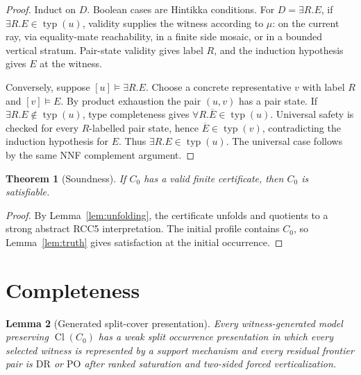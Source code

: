 \documentclass[11pt]{article}
\newtheorem{theorem}{Theorem}[section]
\newtheorem{lemma}[theorem]{Lemma}
\newcommand{\Cl}{\operatorname{Cl}}
\newcommand{\typ}{\operatorname{typ}}
\newcommand{\DR}{\mathrm{DR}}
\newcommand{\PO}{\mathrm{PO}}
\begin{document}
\begin{proof}
Induct on $D$.  Boolean cases are Hintikka conditions.  For $D=\exists R.E$, if $\exists R.E\in\typ(u)$, validity supplies the witness according to $\mu$: on the current ray, via equality-mate reachability, in a finite side mosaic, or in a bounded vertical stratum.  Pair-state validity gives label $R$, and the induction hypothesis gives $E$ at the witness.

Conversely, suppose $[u]\models\exists R.E$.  Choose a concrete representative $v$ with label $R$ and $[v]\models E$.  By product exhaustion the pair $(u,v)$ has a pair state.  If $\exists R.E\notin\typ(u)$, type completeness gives $\forall R.\overline E\in\typ(u)$.  Universal safety is checked for every $R$-labelled pair state, hence $\overline E\in\typ(v)$, contradicting the induction hypothesis for $E$.  Thus $\exists R.E\in\typ(u)$.  The universal case follows by the same NNF complement argument.
\end{proof}

\begin{theorem}[Soundness]
If $C_0$ has a valid finite certificate, then $C_0$ is satisfiable.
\end{theorem}

\begin{proof}
By Lemma~\ref{lem:unfolding}, the certificate unfolds and quotients to a strong abstract RCC5 interpretation.  The initial profile contains $C_0$, so Lemma~\ref{lem:truth} gives satisfaction at the initial occurrence.
\end{proof}

\section{Completeness}

\begin{lemma}[Generated split-cover presentation]
\label{lem:split-cover}
Every witness-generated model preserving $\Cl(C_0)$ has a weak split occurrence presentation in which every selected witness is represented by a support mechanism and every residual frontier pair is $\DR$ or $\PO$ after ranked saturation and two-sided forced verticalization.
\end{lemma}
\end{document}
